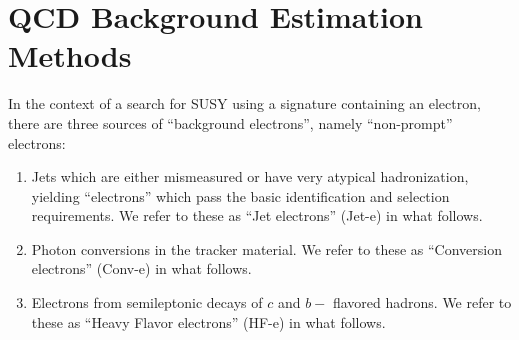 \section{QCD Background Estimation Methods}

\label{sec:QCD_bkgd_est}

In the context of a search for SUSY using a signature containing an electron, there are three sources of ``background electrons'', namely ``non-prompt'' electrons:
\begin{enumerate}
\item Jets which are either mismeasured or have very atypical hadronization, yielding ``electrons'' which pass the basic identification and selection requirements.  We refer to these as ``Jet electrons'' (Jet-e) in what follows.
\item Photon conversions in the tracker material.  We refer to these as ``Conversion electrons'' (Conv-e) in what follows.
\item Electrons from semileptonic decays of $c$ and $b-$ flavored hadrons.  We refer to these as ``Heavy Flavor electrons'' (HF-e) in what follows.
\end{enumerate}

